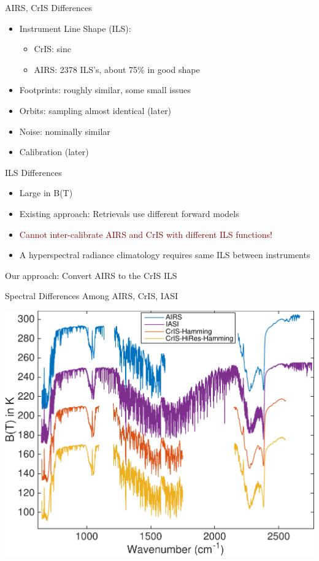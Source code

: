 \documentclass[10pt,t]{beamer}
\begin{document}
\begin{frame}[label={sec:org47a3590}]{AIRS, CrIS Differences}
\vspace{-0.1in}
\begin{itemize}
\item Instrument Line Shape (ILS): 
\begin{itemize}
\item CrIS: sinc
\item AIRS: 2378 ILS's, about 75\% in good shape
\end{itemize}
\item Footprints: roughly similar, some small issues
\item Orbits: sampling almost identical (later)
\item Noise: nominally similar
\item Calibration (later)
\end{itemize}

\begin{block}{ILS Differences}
\vspace{-0.05in}
\begin{itemize}
\item Large in B(T)
\item Existing approach: Retrievals use different forward models
\item \textcolor{maroon}{Cannot inter-calibrate AIRS and CrIS with different ILS functions!}
\item A hyperspectral radiance climatology requires same ILS between instruments
\end{itemize}

\large Our approach: Convert AIRS to the CrIS ILS
\end{block}
\end{frame}

\begin{frame}[label={sec:org4ed66b8}]{Spectral Differences Among AIRS, CrIS, IASI}
\begin{center}
\includegraphics[width=0.85\linewidth]{./Figs/Pdf/hyperall_hamming.pdf}
\end{center}
\end{frame}
\end{document}
